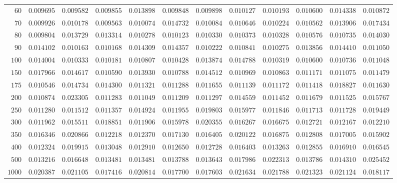 \begin{sidewaystable}
\begin{tabular}{r|rrrrrrrrrrr}
$60$ & $0.009695$ & $0.009582$ & $0.009855$ & $0.013898$ & $0.009848$ & $0.009898$ & $0.010127$ & $0.010193$ & $0.010600$ & $0.014338$ & $0.010872$ \\
$70$ & $0.009926$ & $0.010178$ & $0.009563$ & $0.010074$ & $0.014732$ & $0.010084$ & $0.010646$ & $0.010224$ & $0.010562$ & $0.013906$ & $0.017434$ \\
$80$ & $0.009804$ & $0.013729$ & $0.013314$ & $0.010278$ & $0.010123$ & $0.010330$ & $0.010373$ & $0.010328$ & $0.010576$ & $0.010735$ & $0.014030$ \\
$90$ & $0.014102$ & $0.010163$ & $0.010168$ & $0.014309$ & $0.014357$ & $0.010222$ & $0.010841$ & $0.010275$ & $0.013856$ & $0.014410$ & $0.011050$ \\
$100$ & $0.014004$ & $0.010333$ & $0.010181$ & $0.010807$ & $0.010428$ & $0.013874$ & $0.014788$ & $0.010319$ & $0.010600$ & $0.010736$ & $0.011048$ \\
$150$ & $0.017966$ & $0.014617$ & $0.010590$ & $0.013930$ & $0.010788$ & $0.014512$ & $0.010969$ & $0.010863$ & $0.011171$ & $0.011075$ & $0.011479$ \\
$175$ & $0.010546$ & $0.014734$ & $0.014300$ & $0.011321$ & $0.011288$ & $0.011655$ & $0.011139$ & $0.011172$ & $0.011418$ & $0.018827$ & $0.011630$ \\
$200$ & $0.010874$ & $0.023305$ & $0.011283$ & $0.011049$ & $0.011209$ & $0.011297$ & $0.014559$ & $0.011452$ & $0.011679$ & $0.011525$ & $0.015767$ \\
$250$ & $0.011280$ & $0.011512$ & $0.011357$ & $0.014924$ & $0.011955$ & $0.019803$ & $0.015977$ & $0.011846$ & $0.011713$ & $0.011728$ & $0.019449$ \\
$300$ & $0.011962$ & $0.015511$ & $0.018851$ & $0.011906$ & $0.015978$ & $0.020355$ & $0.016267$ & $0.016675$ & $0.012721$ & $0.012167$ & $0.012210$ \\
$350$ & $0.016346$ & $0.020866$ & $0.012218$ & $0.012370$ & $0.017130$ & $0.016405$ & $0.020122$ & $0.016875$ & $0.012808$ & $0.017005$ & $0.015902$ \\
$400$ & $0.012324$ & $0.019915$ & $0.013048$ & $0.012910$ & $0.012650$ & $0.012728$ & $0.016403$ & $0.013263$ & $0.012855$ & $0.016910$ & $0.016545$ \\
$500$ & $0.013216$ & $0.016648$ & $0.013481$ & $0.013481$ & $0.013788$ & $0.013643$ & $0.017986$ & $0.022313$ & $0.013786$ & $0.014310$ & $0.025452$ \\
$1000$ & $0.020387$ & $0.021105$ & $0.017416$ & $0.020814$ & $0.017700$ & $0.017603$ & $0.021634$ & $0.021788$ & $0.021323$ & $0.021124$ & $0.018117$ \\
\hline
\end{tabular}
\end{sidewaystable}
 
 
